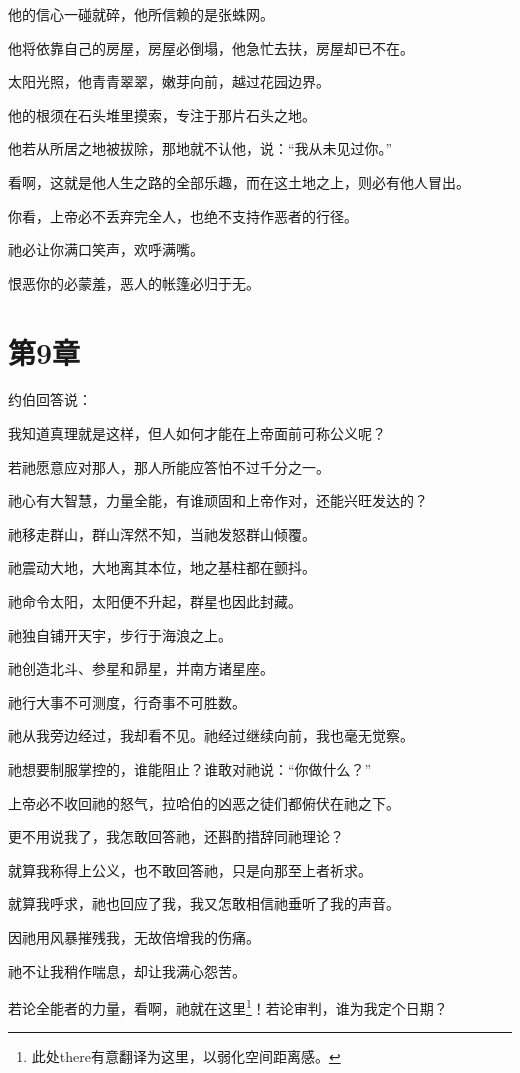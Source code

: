 \documentclass[12pt,oneside]{book}
\begin{document}
他的信心一碰就碎，他所信赖的是张蛛网。

他将依靠自己的房屋，房屋必倒塌，他急忙去扶，房屋却已不在。

太阳光照，他青青翠翠，嫩芽向前，越过花园边界。

他的根须在石头堆里摸索，专注于那片石头之地。

他若从所居之地被拔除，那地就不认他，说：“我从未见过你。”

看啊，这就是他人生之路的全部乐趣，而在这土地之上，则必有他人冒出。

你看，上帝必不丢弃完全人，也绝不支持作恶者的行径。

祂必让你满口笑声，欢呼满嘴。

恨恶你的必蒙羞，恶人的帐篷必归于无。



\chapter{第9章}
约伯回答说：

我知道真理就是这样，但人如何才能在上帝面前可称公义呢？

若祂愿意应对那人，那人所能应答怕不过千分之一。

祂心有大智慧，力量全能，有谁顽固和上帝作对，还能兴旺发达的？

祂移走群山，群山浑然不知，当祂发怒群山倾覆。

祂震动大地，大地离其本位，地之基柱都在颤抖。

祂命令太阳，太阳便不升起，群星也因此封藏。

祂独自铺开天宇，步行于海浪之上。

祂创造北斗、参星和昴星，并南方诸星座。

祂行大事不可测度，行奇事不可胜数。

祂从我旁边经过，我却看不见。祂经过继续向前，我也毫无觉察。

祂想要制服掌控的，谁能阻止？谁敢对祂说：“你做什么？”

上帝必不收回祂的怒气，拉哈伯的凶恶之徒们都俯伏在祂之下。

更不用说我了，我怎敢回答祂，还斟酌措辞同祂理论？

就算我称得上公义，也不敢回答祂，只是向那至上者祈求。

就算我呼求，祂也回应了我，我又怎敢相信祂垂听了我的声音。

因祂用风暴摧残我，无故倍增我的伤痛。

祂不让我稍作喘息，却让我满心怨苦。

若论全能者的力量，看啊，祂就在这里\footnote{此处there有意翻译为这里，以弱化空间距离感。}！若论审判，谁为我定个日期？
\end{document}
